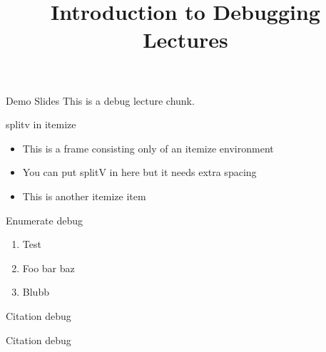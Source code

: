 \documentclass[11pt,compress,t,notes=noshow, xcolor=table]{beamer}
\title{Introduction to Debugging Lectures}
\begin{document}

\begin{frame}{Demo Slides}
  \vfill
  This is a debug lecture chunk.
  \vfill
\end{frame}


\begin{frame}{splitv in itemize}
  \begin{itemize}
    \item This is a frame consisting only of an itemize environment
    \item You can put splitV in here but it needs extra spacing
    \vfill
    \vfill
    \item This is another itemize item
  \end{itemize}
\end{frame}

\begin{frame}{Enumerate debug}
  \begin{enumerate}
    \item Test
    \item Foo bar baz
    \item Blubb
  \end{enumerate}
\end{frame}


\begin{frame}{Citation debug}
  \vfill
\end{frame}

\begin{frame}{Citation debug}
\end{frame}
\end{document}
